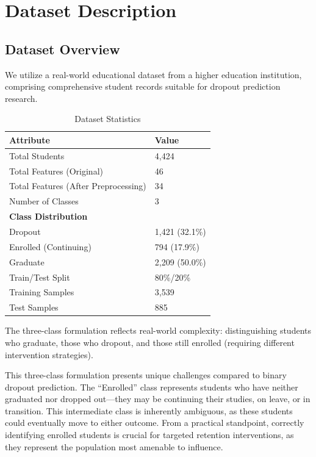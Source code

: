 \documentclass[journal]{IEEEtran}
\begin{document}
\section{Dataset Description}

\subsection{Dataset Overview}

We utilize a real-world educational dataset from a higher education institution, comprising comprehensive student records suitable for dropout prediction research.

\begin{table}[h]
\centering
\caption{Dataset Statistics}
\label{tab:dataset_stats}
\begin{tabular}{ll}
\toprule
\textbf{Attribute} & \textbf{Value} \\
\midrule
Total Students & 4,424 \\
Total Features (Original) & 46 \\
Total Features (After Preprocessing) & 34 \\
Number of Classes & 3 \\
\midrule
\multicolumn{2}{l}{\textbf{Class Distribution}} \\
\quad Dropout & 1,421 (32.1\%) \\
\quad Enrolled (Continuing) & 794 (17.9\%) \\
\quad Graduate & 2,209 (50.0\%) \\
\midrule
Train/Test Split & 80\%/20\% \\
Training Samples & 3,539 \\
Test Samples & 885 \\
\bottomrule
\end{tabular}
\end{table}

The three-class formulation reflects real-world complexity: distinguishing students who graduate, those who dropout, and those still enrolled (requiring different intervention strategies).

This three-class formulation presents unique challenges compared to binary dropout prediction. The ``Enrolled'' class represents students who have neither graduated nor dropped out---they may be continuing their studies, on leave, or in transition. This intermediate class is inherently ambiguous, as these students could eventually move to either outcome. From a practical standpoint, correctly identifying enrolled students is crucial for targeted retention interventions, as they represent the population most amenable to influence.
\end{document}
